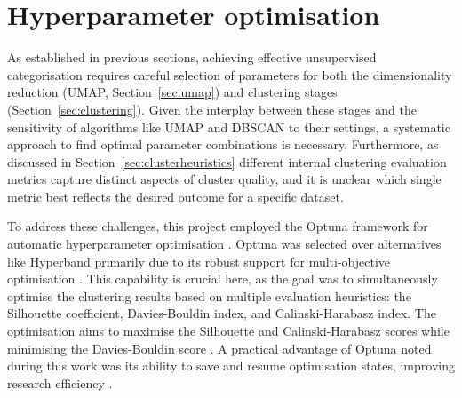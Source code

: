 \documentclass[10pt,oneside]{report}
\begin{document}

\section{Hyperparameter optimisation}\label{sec:hyperparameterOpt}

As established in previous sections, achieving effective unsupervised categorisation requires careful selection of parameters for both the dimensionality reduction (UMAP, Section~\ref{sec:umap}) and clustering stages (Section~\ref{sec:clustering}). Given the interplay between these stages and the sensitivity of algorithms like UMAP and DBSCAN to their settings, a systematic approach to find optimal parameter combinations is necessary. Furthermore, as discussed in Section~\ref{sec:clusterheuristics} different internal clustering evaluation metrics capture distinct aspects of cluster quality, and it is unclear which single metric best reflects the desired outcome for a specific dataset.   

To address these challenges, this project employed the Optuna framework for automatic hyperparameter optimisation \cite{akiba2019optuna}. Optuna was selected over alternatives like Hyperband \cite{li2018hyperband} primarily due to its robust support for multi-objective optimisation \cite{akiba2019optuna}. This capability is crucial here, as the goal was to simultaneously optimise the clustering results based on multiple evaluation heuristics: the Silhouette coefficient, Davies-Bouldin index, and Calinski-Harabasz index. The optimisation aims to maximise the Silhouette and Calinski-Harabasz scores while minimising the Davies-Bouldin score \cite{rousseeuw1987silhouettes, davies1979cluster, calinski1974dendrite}. A practical advantage of Optuna noted during this work was its ability to save and resume optimisation states, improving research efficiency \cite{akiba2019optuna}.   
\end{document}
